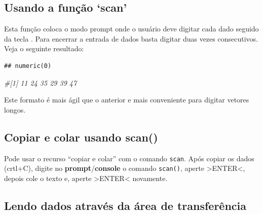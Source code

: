 \documentclass[
]{book}
\newenvironment{Shaded}{\begin{snugshade}}{\end{snugshade}}
\newcommand{\CommentTok}[1]{\textcolor[rgb]{0.56,0.35,0.01}{\textit{#1}}}
\newcommand{\KeywordTok}[1]{\textcolor[rgb]{0.13,0.29,0.53}{\textbf{#1}}}
\newcommand{\NormalTok}[1]{#1}
\newcommand{\StringTok}[1]{\textcolor[rgb]{0.31,0.60,0.02}{#1}}
\begin{document}
\hypertarget{usando-a-funuxe7uxe3o-scan}{%
\subsection{Usando a função `scan'}\label{usando-a-funuxe7uxe3o-scan}}

Esta função coloca o modo prompt onde o usuário deve digitar cada dado seguido da tecla . Para encerrar a entrada de dados basta digitar duas vezes consecutivos. Veja o seguinte resultado:

\begin{Shaded}
\end{Shaded}

\begin{verbatim}
## numeric(0)
\end{verbatim}

\begin{Shaded}
\begin{Highlighting}[]
\CommentTok{#[1] 11 24 35 29 39 47}
\end{Highlighting}
\end{Shaded}

Este formato é mais ágil que o anterior e mais conveniente para digitar vetores longos.

\hypertarget{copiar-e-colar-usando-scan}{%
\subsection{Copiar e colar usando scan()}\label{copiar-e-colar-usando-scan}}

Pode usar o recurso ``copiar e colar'' com o comando \texttt{scan}.
Após copiar os dados (crtl+C), digite no \textbf{prompt}/\textbf{console} o comando \texttt{scan()}, aperte \textgreater ENTER\textless, depois cole o texto e, aperte \textgreater ENTER\textless{} novamente.

\hypertarget{lendo-dados-atravuxe9s-da-uxe1rea-de-transferuxeancia}{%
\subsection{Lendo dados através da área de transferência}\label{lendo-dados-atravuxe9s-da-uxe1rea-de-transferuxeancia}}
\end{document}
